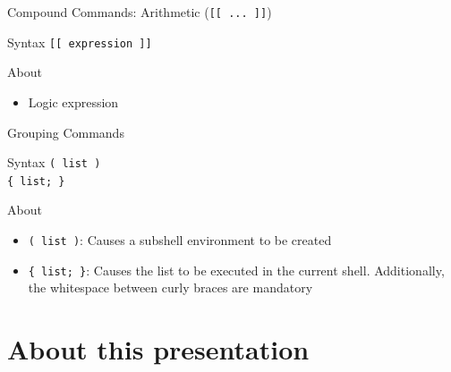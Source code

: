 \documentclass[10pt, compress, aspectratio=169]{beamer}
\begin{document}
\begin{frame}{Compound Commands: Arithmetic (\texttt{[[ ... ]]})}
  \begin{alertblock}{Syntax}
    \texttt{[[ expression ]]}
  \end{alertblock}
  \begin{exampleblock}{About}
    \begin{itemize}
      \item Logic expression
    \end{itemize}
  \end{exampleblock}
\end{frame}

\begin{frame}{Grouping Commands}
  \begin{alertblock}{Syntax}
    \texttt{( list )} \\
    \texttt{\{ list; \}}
  \end{alertblock}
  \begin{exampleblock}{About}
    \begin{itemize}
      \item \texttt{( list )}: Causes a subshell environment to be created
      \item \texttt{\{ list; \}}: Causes the list to be executed in the current
            shell. Additionally, the whitespace between curly braces are
            mandatory
    \end{itemize}
  \end{exampleblock}
\end{frame}


\section{About this presentation}
\begin{frame}[standout]
   \begin{center}\ccbysa\end{center}
\end{frame}

\maketitle
\end{document}
